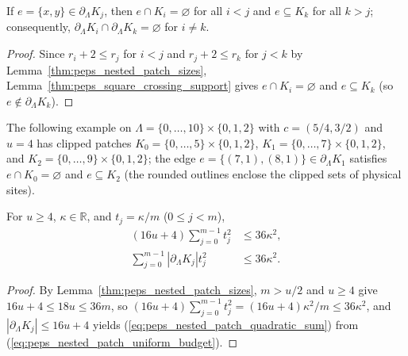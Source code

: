 \begin{lemma}
    \label{thm:peps_nested_patch_crossing}
    \leanok
    If $e=\{x,y\}\in\partial_\Lambda K_j$, then $e\cap K_i=\varnothing$ for all $i<j$ and $e\subseteq K_k$ for all $k>j$; consequently, $\partial_\Lambda K_i\cap\partial_\Lambda K_k=\varnothing$ for $i\ne k$.
\end{lemma}
\begin{proof}\leanok
    Since $r_i+2\le r_j$ for $i<j$ and $r_j+2\le r_k$ for $j<k$ by Lemma~\ref{thm:peps_nested_patch_sizes}, Lemma~\ref{thm:peps_square_crossing_support} gives $e\cap K_i=\varnothing$ and $e\subseteq K_k$ (so $e\notin\partial_\Lambda K_k$).
\end{proof}

The following example on $\Lambda=\{0,\ldots,10\}\times\{0,1,2\}$ with
$c=(5/4,3/2)$ and $u=4$ has clipped patches
$K_0=\{0,\ldots,5\}\times\{0,1,2\}$,
$K_1=\{0,\ldots,7\}\times\{0,1,2\}$, and
$K_2=\{0,\ldots,9\}\times\{0,1,2\}$;
the edge $e=\{(7,1),(8,1)\}\in\partial_\Lambda K_1$ satisfies $e\cap K_0=\varnothing$
and $e\subseteq K_2$ (the rounded outlines enclose the clipped sets of physical sites).



\begin{lemma}
    \label{thm:peps_nested_patch_quadratic_sum}
    \leanok
    For $u\ge4$, $\kappa\in\mathbb R$, and $t_j=\kappa/m$ ($0\le j<m$),
    \begin{align}
        (16u+4)\sum_{j=0}^{m-1}t_j^2                & \le36\kappa^2,
        \label{eq:peps_nested_patch_uniform_budget}                  \\
        \sum_{j=0}^{m-1}|\partial_\Lambda K_j|t_j^2 & \le36\kappa^2.
        \label{eq:peps_nested_patch_quadratic_sum}
    \end{align}
\end{lemma}
\begin{proof}\leanok
    By Lemma~\ref{thm:peps_nested_patch_sizes}, $m>u/2$ and $u\ge4$ give $16u+4\le 18u\le 36m$, so $(16u+4)\sum_{j=0}^{m-1}t_j^2=(16u+4)\kappa^2/m\le 36\kappa^2$, and $|\partial_\Lambda K_j|\le 16u+4$ yields (\ref{eq:peps_nested_patch_quadratic_sum}) from (\ref{eq:peps_nested_patch_uniform_budget}).
\end{proof}

